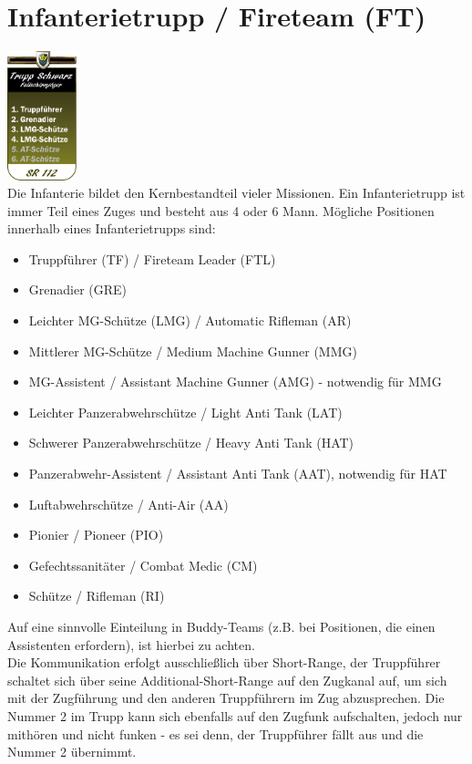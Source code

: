 \section{Infanterietrupp / Fireteam (FT)}
\includegraphics[width=20mm]{./img/truppenordnung/infanterie/infanterie.png}\\
Die Infanterie bildet den Kernbestandteil vieler Missionen. Ein Infanterietrupp ist immer Teil eines Zuges und besteht aus 4 oder 6 Mann. Mögliche Positionen innerhalb eines Infanterietrupps sind:
\begin{itemize}
	\item Truppführer (TF) / Fireteam Leader (FTL)
	\item Grenadier (GRE)
	\item Leichter MG-Schütze (LMG) / Automatic Rifleman (AR)
	\item Mittlerer MG-Schütze / Medium Machine Gunner (MMG)
	\item MG-Assistent / Assistant Machine Gunner (AMG) - notwendig für MMG
	\item Leichter Panzerabwehrschütze / Light Anti Tank (LAT)
	\item Schwerer Panzerabwehrschütze / Heavy Anti Tank (HAT)
	\item Panzerabwehr-Assistent / Assistant Anti Tank (AAT), notwendig für HAT
	\item Luftabwehrschütze / Anti-Air (AA)
	\item Pionier / Pioneer (PIO)
	\item Gefechtssanitäter / Combat Medic (CM)
	\item Schütze / Rifleman (RI)
\end{itemize}
Auf eine sinnvolle Einteilung in Buddy-Teams (z.B. bei Positionen, die einen Assistenten erfordern), ist hierbei zu achten.\\
Die Kommunikation erfolgt ausschließlich über Short-Range, der Truppführer schaltet sich über seine Additional-Short-Range auf den Zugkanal auf, um sich mit der Zugführung und den anderen Truppführern im Zug abzusprechen. Die Nummer 2 im Trupp kann sich ebenfalls auf den Zugfunk aufschalten, jedoch nur mithören und nicht funken - es sei denn, der Truppführer fällt aus und die Nummer 2 übernimmt.